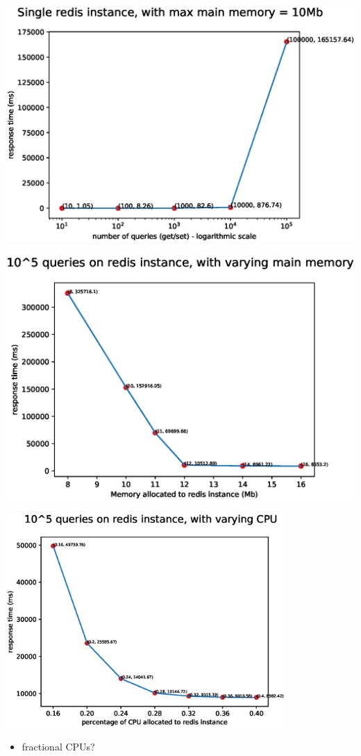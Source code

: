 \documentclass{beamer}
\begin{document}
\begin{frame}
    \includegraphics[width=\textwidth]{fig2.eps}
\end{frame}


\begin{frame}
    \includegraphics[width=\textwidth]{fig3.eps}
\end{frame}

\begin{frame}
\begin{center}
    \includegraphics[width=0.8\textwidth]{fig4.eps}
\end{center}
    \begin{itemize}
        \item fractional CPUs?
    \end{itemize}
\end{frame}
\end{document}
